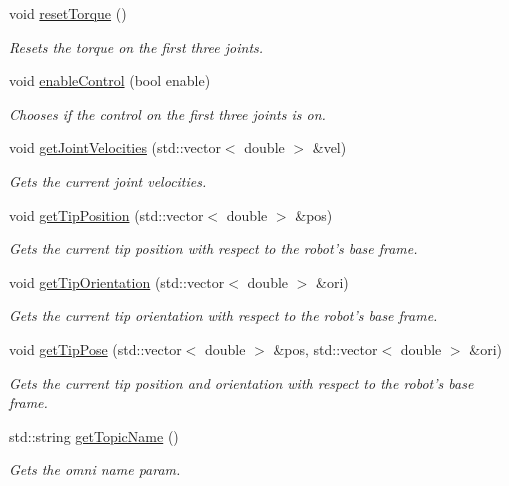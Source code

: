 \begin{DoxyCompactItemize}
void \hyperlink{classOmniBase_af5bd87d6589d31d88080f51f23b589df}{reset\-Torque} ()
\begin{DoxyCompactList}\small\item\em Resets the torque on the first three joints. \end{DoxyCompactList}\item 
void \hyperlink{classOmniBase_a1665798fd79dd5fb09a86e054364d5ce}{enable\-Control} (bool enable)
\begin{DoxyCompactList}\small\item\em Chooses if the control on the first three joints is on. \end{DoxyCompactList}\item 
void \hyperlink{classOmniBase_a81b7e2a28ea342cd956b549c8478c4c2}{get\-Joint\-Velocities} (std\-::vector$<$ double $>$ \&vel)
\begin{DoxyCompactList}\small\item\em Gets the current joint velocities. \end{DoxyCompactList}\item 
void \hyperlink{classOmniBase_a633d60e797f463662e7e43fa26ab339a}{get\-Tip\-Position} (std\-::vector$<$ double $>$ \&pos)
\begin{DoxyCompactList}\small\item\em Gets the current tip position with respect to the robot's base frame. \end{DoxyCompactList}\item 
void \hyperlink{classOmniBase_ab5a4cfa7473ec7ec301d6fa8565693f1}{get\-Tip\-Orientation} (std\-::vector$<$ double $>$ \&ori)
\begin{DoxyCompactList}\small\item\em Gets the current tip orientation with respect to the robot's base frame. \end{DoxyCompactList}\item 
void \hyperlink{classOmniBase_a19382d9187bca9ad3be17b8b5f5578ef}{get\-Tip\-Pose} (std\-::vector$<$ double $>$ \&pos, std\-::vector$<$ double $>$ \&ori)
\begin{DoxyCompactList}\small\item\em Gets the current tip position and orientation with respect to the robot's base frame. \end{DoxyCompactList}\item 
std\-::string \hyperlink{classOmniBase_ac5e0bcd250af6cc9a7396fa9306519ec}{get\-Topic\-Name} ()
\begin{DoxyCompactList}\small\item\em Gets the omni name param. \end{DoxyCompactList}\item 

\end{DoxyCompactItemize}
